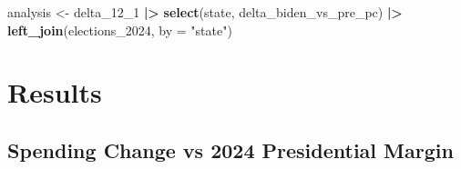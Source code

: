 \documentclass[
  11pt,
]{article}
\newenvironment{Shaded}{\begin{snugshade}}{\end{snugshade}}
\newcommand{\AttributeTok}[1]{\textcolor[rgb]{0.13,0.29,0.53}{#1}}
\newcommand{\FunctionTok}[1]{\textcolor[rgb]{0.13,0.29,0.53}{\textbf{#1}}}
\newcommand{\NormalTok}[1]{#1}
\newcommand{\OtherTok}[1]{\textcolor[rgb]{0.56,0.35,0.01}{#1}}
\newcommand{\SpecialCharTok}[1]{\textcolor[rgb]{0.81,0.36,0.00}{\textbf{#1}}}
\newcommand{\StringTok}[1]{\textcolor[rgb]{0.31,0.60,0.02}{#1}}
\begin{document}
\begin{Shaded}
\begin{Highlighting}[]
\NormalTok{analysis }\OtherTok{\textless{}{-}}\NormalTok{ delta\_12\_1 }\SpecialCharTok{|\textgreater{}}
  \FunctionTok{select}\NormalTok{(state, delta\_biden\_vs\_pre\_pc) }\SpecialCharTok{|\textgreater{}}
  \FunctionTok{left\_join}\NormalTok{(elections\_2024, }\AttributeTok{by =} \StringTok{"state"}\NormalTok{)}
\end{Highlighting}
\end{Shaded}

\section{Results}\label{results}

\subsection{Spending Change vs 2024 Presidential
Margin}\label{spending-change-vs-2024-presidential-margin}
\end{document}

